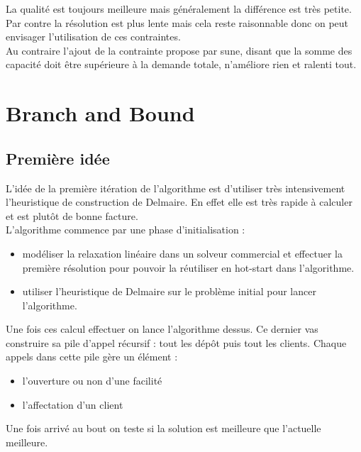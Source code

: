 \documentclass[12pt,a4paper]{article}
\begin{document}
La qualité est toujours meilleure mais généralement la différence est très petite. Par contre la résolution est plus lente mais cela reste raisonnable donc on peut envisager l'utilisation de ces contraintes.\\

Au contraire l'ajout de la contrainte propose par sune, disant que la somme des capacité doit être supérieure à la demande totale, n’améliore rien et ralenti tout.

\section{Branch and Bound}

\subsection{Première idée}

L'idée de la première itération de l'algorithme est d'utiliser très intensivement l'heuristique de construction de Delmaire. En effet elle est très rapide à calculer et est plutôt de bonne facture.\\

L'algorithme commence par une phase d'initialisation :
\begin{itemize}
\item
modéliser la relaxation linéaire dans un solveur commercial et effectuer la première résolution pour pouvoir la réutiliser en hot-start dans l'algorithme.
\item
utiliser l'heuristique de Delmaire sur le problème initial pour lancer l'algorithme.
\end{itemize}

Une fois ces calcul effectuer on lance l'algorithme dessus. Ce dernier vas construire sa pile d'appel récursif : tout les dépôt puis tout les clients. Chaque appels dans cette pile gère un élément : 
\begin{itemize}
\item
l'ouverture ou non d'une facilité
\item
l'affectation d'un client
\end{itemize}
Une fois arrivé au bout on teste si la solution est meilleure que l'actuelle meilleure.\\
\end{document}
